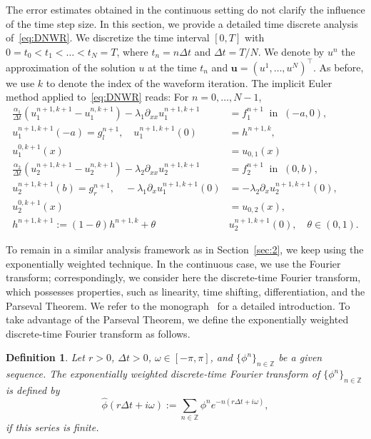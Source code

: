 \documentclass[reqno]{amsart}
\newtheorem{definition}{Definition}
\begin{document}
The error estimates obtained in the continuous setting do not clarify the influence of the time step size. In this section, we provide a detailed time discrete analysis of~\eqref{eq:DNWR}. We discretize the time interval $[0, T]$ with $0=t_0 < t_1 < \ldots < t_N = T$, where $t_n = n\Delta t$ and $\Delta t = T/N$. We denote by $u^n$ the approximation of the solution $u$ at the time $t_n$ and $\boldsymbol{u} = (u^1, \ldots, u^N)^\top$. As before, we use $k$ to denote the index of the waveform iteration. The implicit Euler method applied to~\eqref{eq:DNWR} reads: For $n=0, \ldots, N-1$,
\begin{equation}\label{eq:DNWRIE}
	\begin{aligned}
		\frac{\alpha_1}{\Delta t} (u_1^{n+1, k+1} - u_1^{n, k+1}) - \lambda_1 \partial_{xx} u_1^{n+1, k+1} &= f_1^{n+1} \ \text{ in } \ (-a,0) , \\
		u_1^{n+1, k+1}(-a) = g_l^{n+1}, \quad 
		u_1^{n+1, k+1}(0) &= h^{n+1, k},\\
		u_1^{0, k+1}(x) &= u_{0, 1}(x) \\
		\frac{\alpha_2}{\Delta t} (u_2^{n+1, k+1}-u_2^{n, k+1})-\lambda_2 \partial_{xx} u_2^{n+1, k+1} &= f_2^{n+1} \ \text{ in } \ (0,b),\\
		u_2^{n+1,k+1}(b) = g_r^{n+1}, \quad
		-\lambda_1 \partial_x u_1^{n+1, k+1}(0) &= -\lambda_2 \partial_x u_2^{n+1, k+1}(0), \\
		u_2^{0, k+1}(x) &= u_{0, 2}(x),\\
		h^{n+1, k+1} := (1-\theta) h^{n+1, k} + \theta &u^{n+1, k+1}_2(0),  \quad \theta\in(0, 1).
	\end{aligned}
	\tag{DNWR-IE}
\end{equation}


To remain in a similar analysis framework as in Section~\ref{sec:2}, we keep using the exponentially weighted technique. In the continuous case, we use the Fourier transform; correspondingly, we consider here the discrete-time Fourier transform, which possesses properties, such as linearity, time shifting, differentiation, and the Parseval Theorem. We refer to the monograph~\cite[Chapter 2.9]{Oppenheim1999} for a detailed introduction. To take advantage of the Parseval Theorem, we define the exponentially weighted discrete-time Fourier transform as follows.


\begin{definition}\label{def:DiscFourier}
Let $r>0$, $\Delta t>0$, $\omega \in [-\pi, \pi]$,  and $\{\phi^n\}_{n\in\mathbb{Z}}$ be a given sequence. 
The exponentially weighted discrete-time Fourier transform of $\{\phi^n\}_{n\in\mathbb{Z}}$ is defined by
\[\widehat{\phi}(r\Delta t + i \omega) := \sum_{n\in\mathbb{Z}} \phi^n e^{-n(r\Delta t+i\omega)},\]
if this series is finite. 
\end{definition}
\end{document}
